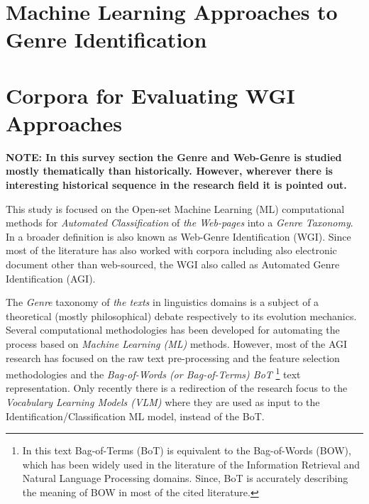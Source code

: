 
\section{Machine Learning Approaches to Genre Identification}

\section{Corpora for Evaluating WGI Approaches}

\textbf{NOTE: In this survey section the Genre and Web-Genre is studied mostly thematically than historically. However, wherever there is interesting historical sequence in the research field it is pointed out.}

This study is focused on the Open-set Machine Learning (ML) computational methods for \textit{Automated Classification} of \textit{the Web-pages} into a \textit{Genre Taxonomy}. In a broader definition is also known as Web-Genre Identification (WGI). Since most of the literature has also worked with corpora including also electronic document other than web-sourced, the WGI also called as Automated Genre Identification (AGI).

The \textit{Genre} taxonomy of \textit{the texts} in linguistics domains is a subject of a theoretical (mostly philosophical) debate respectively to its evolution mechanics. Several computational methodologies has been developed for automating the process based on \textit{Machine Learning (ML)} methods. However, most of the AGI research has focused on the raw text pre-processing and the feature selection methodologies and the \textit{Bag-of-Words (or Bag-of-Terms) BoT }\footnote{In this text Bag-of-Terms (BoT) is equivalent to the Bag-of-Words  (BOW), which has been widely used in the literature of the Information Retrieval and Natural Language Processing domains. Since, BoT is accurately describing the meaning of BOW in most of the cited literature.} text representation. Only recently there is a redirection of the research focus to the \textit{Vocabulary Learning Models (VLM)} where they are used as input to the Identification/Classification ML model, instead of the BoT. 






